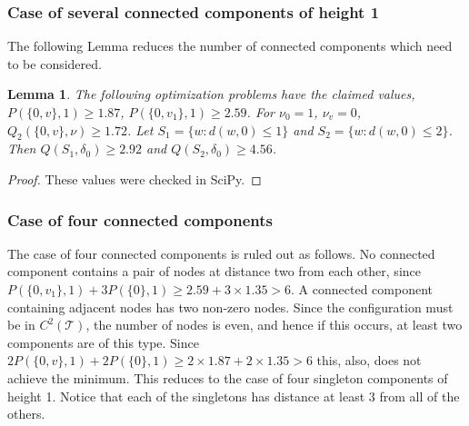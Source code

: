 \documentclass[a4paper, 12pt, notitlepage]{amsart}
\newcommand{\sT}{\mathscr{T}}
\newtheorem{lemma}[theorem]{Lemma}
\theoremstyle{remark}
\begin{document}
 \subsubsection*{Case of several connected components of height 1}
 The following Lemma reduces the number of connected components which need to be considered.
 \begin{lemma}
  The following optimization problems have the claimed values, $P(\{0, v\}, 1)  \geq 1.87$, $P(\{0, v_1\}, 1) \geq 2.59$. For $\nu_0 = 1$, $\nu_v = 0$, $Q_2(\{0,v\}, \nu) \geq 1.72$.
    Let $S_1 = \{w: d(w,0) \leq 1\}$ and $S_2 = \{w:  d(w,0) \leq 2\}$.  Then $Q(S_1, \delta_0) \geq 2.92$ and $Q(S_2, \delta_0) \geq 4.56$.
  
  \end{lemma}
\begin{proof}
 These values were checked in SciPy.
\end{proof}

\subsubsection*{Case of four connected components}
The case of four connected components is ruled out as follows.  No connected component contains a pair of nodes at distance two from each other, since $P(\{0, v_1\}, 1) + 3 P(\{0\}, 1) \geq 2.59+ 3 \times 1.35  > 6$.  A connected component containing adjacent nodes has two non-zero nodes.  Since the configuration must be in $C^2(\sT)$, the number of nodes is even, and hence if this occurs, at least two components are of this type. Since $2P(\{0, v\}, 1) + 2 P(\{0\}, 1) \geq 2 \times 1.87 + 2 \times 1.35 >6 $ this, also, does not achieve the minimum. This reduces to the case of four singleton components of height 1.  Notice that each of the singletons has distance at least 3 from all of the others.  
\end{document}

